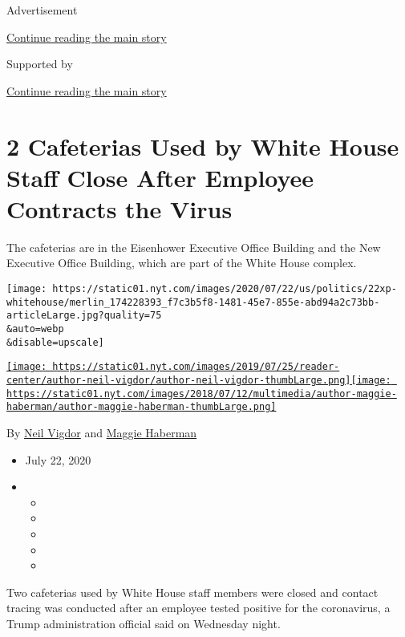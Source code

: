Advertisement

\protect\hyperlink{after-top}{Continue reading the main story}

Supported by

\protect\hyperlink{after-sponsor}{Continue reading the main story}

\hypertarget{2-cafeterias-used-by-white-house-staff-close-after-employee-contracts-the-virus}{%
\section{2 Cafeterias Used by White House Staff Close After Employee
Contracts the
Virus}\label{2-cafeterias-used-by-white-house-staff-close-after-employee-contracts-the-virus}}

The cafeterias are in the Eisenhower Executive Office Building and the
New Executive Office Building, which are part of the White House
complex.

\texttt{[image: https://static01.nyt.com/images/2020/07/22/us/politics/22xp-whitehouse/merlin\_174228393\_f7c3b5f8-1481-45e7-855e-abd94a2c73bb-articleLarge.jpg?quality=75\\\&auto=webp\\\&disable=upscale]}

\href{https://www.nytimes.com/by/neil-vigdor}{\texttt{[image: https://static01.nyt.com/images/2019/07/25/reader-center/author-neil-vigdor/author-neil-vigdor-thumbLarge.png]}}\href{https://www.nytimes.com/by/maggie-haberman}{\texttt{[image: https://static01.nyt.com/images/2018/07/12/multimedia/author-maggie-haberman/author-maggie-haberman-thumbLarge.png]}}

By \href{https://www.nytimes.com/by/neil-vigdor}{Neil Vigdor} and
\href{https://www.nytimes.com/by/maggie-haberman}{Maggie Haberman}

\begin{itemize}
\item
  July 22, 2020
\item
  \begin{itemize}
  \item
  \item
  \item
  \item
  \item
  \end{itemize}
\end{itemize}

Two cafeterias used by White House staff members were closed and contact
tracing was conducted after an employee tested positive for the
coronavirus, a Trump administration official said on Wednesday night.

